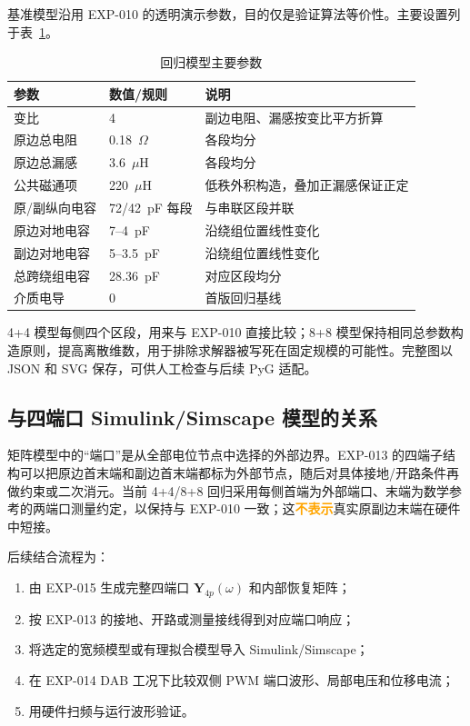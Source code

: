 \documentclass[11pt,a4paper]{ctexart}
\newcommand{\mat}[1]{\bm{#1}}
\newcommand{\warning}[1]{\textcolor{orange}{\bfseries #1}}
\begin{document}
基准模型沿用 EXP-010 的透明演示参数，目的仅是验证算法等价性。主要设置列于表~\ref{tab:param}。

\begin{table}[H]\centering\small
\caption{回归模型主要参数}\label{tab:param}
\begin{tabular}{lll}
\toprule
参数 & 数值/规则 & 说明\\
\midrule
变比 & 4 & 副边电阻、漏感按变比平方折算\\
原边总电阻 & 0.18~$\Omega$ & 各段均分\\
原边总漏感 & 3.6~$\mu$H & 各段均分\\
公共磁通项 & 220~$\mu$H & 低秩外积构造，叠加正漏感保证正定\\
原/副纵向电容 & 72/42~pF 每段 & 与串联区段并联\\
原边对地电容 & 7--4~pF & 沿绕组位置线性变化\\
副边对地电容 & 5--3.5~pF & 沿绕组位置线性变化\\
总跨绕组电容 & 28.36~pF & 对应区段均分\\
介质电导 & 0 & 首版回归基线\\
\bottomrule
\end{tabular}
\end{table}

4+4 模型每侧四个区段，用来与 EXP-010 直接比较；8+8 模型保持相同总参数构造原则，提高离散维数，用于排除求解器被写死在固定规模的可能性。完整图以 JSON 和 SVG 保存，可供人工检查与后续 PyG 适配。

\subsection{与四端口 Simulink/Simscape 模型的关系}

矩阵模型中的“端口”是从全部电位节点中选择的外部边界。EXP-013 的四端子结构可以把原边首末端和副边首末端都标为外部节点，随后对具体接地/开路条件再做约束或二次消元。当前 4+4/8+8 回归采用每侧首端为外部端口、末端为数学参考的两端口测量约定，以保持与 EXP-010 一致；这\warning{不表示}真实原副边末端在硬件中短接。

后续结合流程为：
\begin{enumerate}
\item 由 EXP-015 生成完整四端口 \(\mat Y_{4p}(\omega)\) 和内部恢复矩阵；
\item 按 EXP-013 的接地、开路或测量接线得到对应端口响应；
\item 将选定的宽频模型或有理拟合模型导入 Simulink/Simscape；
\item 在 EXP-014 DAB 工况下比较双侧 PWM 端口波形、局部电压和位移电流；
\item 用硬件扫频与运行波形验证。
\end{enumerate}
\end{document}
